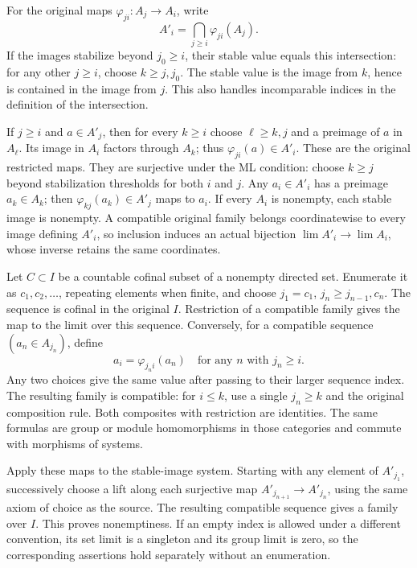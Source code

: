 For the original maps \(\varphi_{ji}:A_j\to A_i\), write \[
A'_i=\bigcap_{j\geq i}\varphi_{ji}(A_j).
\] If the images stabilize beyond \(j_0\geq i\), their stable value equals this intersection: for any other \(j\geq i\), choose \(k\geq j,j_0\). The stable value is the image from \(k\), hence is contained in the image from \(j\). This also handles incomparable indices in the definition of the intersection.

If \(j\geq i\) and \(a\in A'_j\), then for every \(k\geq i\) choose \(\ell\geq k,j\) and a preimage of \(a\) in \(A_\ell\). Its image in \(A_i\) factors through \(A_k\); thus \(\varphi_{ji}(a)\in A'_i\). These are the original restricted maps. They are surjective under the ML condition: choose \(k\geq j\) beyond stabilization thresholds for both \(i\) and \(j\). Any \(a_i\in A'_i\) has a preimage \(a_k\in A_k\); then \(\varphi_{kj}(a_k)\in A'_j\) maps to \(a_i\). If every \(A_i\) is nonempty, each stable image is nonempty. A compatible original family belongs coordinatewise to every image defining \(A'_i\), so inclusion induces an actual bijection \(\lim A'_i\to\lim A_i\), whose inverse retains the same coordinates.

Let \(C\subset I\) be a countable cofinal subset of a nonempty directed set. Enumerate it as \(c_1,c_2,\ldots\), repeating elements when finite, and choose \(j_1=c_1\), \(j_n\geq j_{n-1},c_n\). The sequence is cofinal in the original \(I\). Restriction of a compatible family gives the map to the limit over this sequence. Conversely, for a compatible sequence \((a_n\in A_{j_n})\), define \[
a_i=\varphi_{j_n i}(a_n)\quad\text{for any }n\text{ with }j_n\geq i.
\] Any two choices give the same value after passing to their larger sequence index. The resulting family is compatible: for \(i\leq k\), use a single \(j_n\geq k\) and the original composition rule. Both composites with restriction are identities. The same formulas are group or module homomorphisms in those categories and commute with morphisms of systems.

Apply these maps to the stable-image system. Starting with any element of \(A'_{j_1}\), successively choose a lift along each surjective map \(A'_{j_{n+1}}\to A'_{j_n}\), using the same axiom of choice as the source. The resulting compatible sequence gives a family over \(I\). This proves nonemptiness. If an empty index is allowed under a different convention, its set limit is a singleton and its group limit is zero, so the corresponding assertions hold separately without an enumeration.

